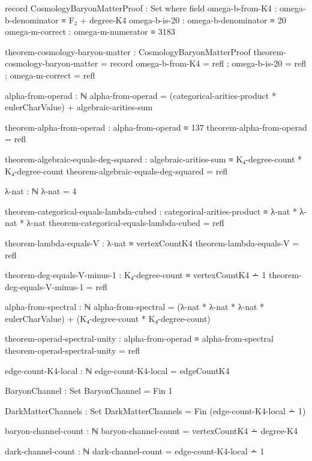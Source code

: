 \documentclass[11pt,a4paper]{book}
\begin{document}
\begin{code}
record CosmologyBaryonMatterProof : Set where
  field
    omega-b-from-K4 : omega-b-denominator ≡ F₂ + degree-K4
    omega-b-is-20   : omega-b-denominator ≡ 20
    omega-m-correct : omega-m-numerator ≡ 3183

theorem-cosmology-baryon-matter : CosmologyBaryonMatterProof
theorem-cosmology-baryon-matter = record
  { omega-b-from-K4 = refl
  ; omega-b-is-20   = refl
  ; omega-m-correct = refl
  }
\end{code}

\label{sec:operad-alpha}
\begin{code}
alpha-from-operad : ℕ
alpha-from-operad = (categorical-arities-product * eulerCharValue) + algebraic-arities-sum

theorem-alpha-from-operad : alpha-from-operad ≡ 137
theorem-alpha-from-operad = refl

theorem-algebraic-equals-deg-squared : algebraic-arities-sum ≡ K₄-degree-count * K₄-degree-count
theorem-algebraic-equals-deg-squared = refl

λ-nat : ℕ
λ-nat = 4

theorem-categorical-equals-lambda-cubed : categorical-arities-product ≡ λ-nat * λ-nat * λ-nat
theorem-categorical-equals-lambda-cubed = refl

theorem-lambda-equals-V : λ-nat ≡ vertexCountK4
theorem-lambda-equals-V = refl

theorem-deg-equals-V-minus-1 : K₄-degree-count ≡ vertexCountK4 ∸ 1
theorem-deg-equals-V-minus-1 = refl

alpha-from-spectral : ℕ
alpha-from-spectral = (λ-nat * λ-nat * λ-nat * eulerCharValue) + (K₄-degree-count * K₄-degree-count)

theorem-operad-spectral-unity : alpha-from-operad ≡ alpha-from-spectral
theorem-operad-spectral-unity = refl
\end{code}

\begin{code}
edge-count-K4-local : ℕ
edge-count-K4-local = edgeCountK4

BaryonChannel : Set
BaryonChannel = Fin 1

DarkMatterChannels : Set
DarkMatterChannels = Fin (edge-count-K4-local ∸ 1)

baryon-channel-count : ℕ
baryon-channel-count = vertexCountK4 ∸ degree-K4

dark-channel-count : ℕ
dark-channel-count = edge-count-K4-local ∸ 1
\end{code}
\end{document}
